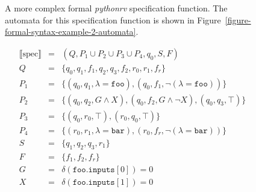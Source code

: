 
\begin{figure}[h!]
	\begin{center}
	\begin{minipage}{0.9\textwidth}
	
	\end{minipage}
	\end{center}

  \caption{A more complex formal \textit{pythonrv} specification function. The automata for
    this specification function is shown in
    Figure~\ref{figure-formal-syntax-example-2-automata}.}
	\label{figure-formal-syntax-example-2}
\end{figure}

\begin{figure}[h!]
	\begin{minipage}{0.9\textwidth}
		\centering
    \[
      \begin{array}{rcl}
        \llbracket \text{spec} \rrbracket & = & (Q, P_1 \cup P_2 \cup P_3 \cup P_4, q_0, S, F) \\
                     Q & = & \{q_0, q_1, f_1, q_2, q_3, f_2, r_0, r_1, f_r\} \\
                   P_1 & = & \{(q_0, q_1, \lambda = \texttt{foo}), (q_0, f_1, \neg(\lambda = \texttt{foo}))\} \\
                   P_2 & = & \{(q_0, q_2, G \wedge X), (q_0, f_2, G \wedge \neg X), (q_0, q_3, \top)\} \\
                   P_3 & = & \{(q_0, r_0, \top), (r_0, q_0, \top)\} \\
                   P_4 & = & \{(r_0, r_1, \lambda = \texttt{bar}), (r_0, f_r, \neg(\lambda = \texttt{bar}))\} \\
                     S & = & \{q_1, q_2, q_3, r_1\} \\
                     F & = & \{f_1, f_2, f_r\} \\
                     G & = & \delta(\texttt{foo.inputs$[0]$}) = 0 \\
                     X & = & \delta(\texttt{foo.inputs$[1]$}) = 0
      \end{array}
    \]
	\end{minipage}

  \bigskip

	\begin{minipage}{0.9\textwidth}
		\centering
		\begin{tikzpicture}[->,shorten >=1pt,node distance=3.5cm,on
      grid,auto,scale=.5,semithick,>=stealth]


\end{tikzpicture}
\end{minipage}
\end{figure}
